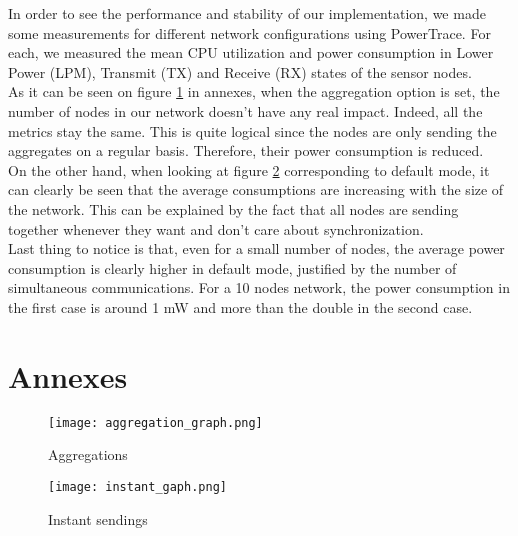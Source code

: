 \documentclass{article}
\begin{document}
In order to see the performance and stability of our implementation, we made some measurements for different network configurations using PowerTrace. For each, we measured the mean CPU utilization and power consumption in Lower Power (LPM), Transmit (TX) and Receive (RX) states of the sensor nodes. \\
As it can be seen on figure \ref{g1} in annexes, when the aggregation option is set, the number of nodes in our network doesn't have any real impact. Indeed, all the metrics stay the same. This is quite logical since the nodes are only sending the aggregates on a regular basis. Therefore, their power consumption is reduced.\\
On the other hand, when looking at figure \ref{g2} corresponding to default mode, it can clearly be seen that the average consumptions are increasing with the size of the network. This can be explained by the fact that all nodes are sending together whenever they want and don't care about synchronization.\\
Last thing to notice is that, even for a small number of nodes, the average power consumption is clearly higher in default mode, justified by the number of simultaneous communications. For a 10 nodes network, the power consumption in the first case is around 1 mW and more than the double in the second case.
\section{Annexes}

\begin{center}
\begin{figure}[!h]
   \texttt{[image: aggregation\_graph.png]}
   \caption{\label{g1} Aggregations}
\end{figure}
\end{center}

\begin{figure}[!h]
   \texttt{[image: instant\_gaph.png]}
   \caption{\label{g2} Instant sendings}
\end{figure}
\end{document}
